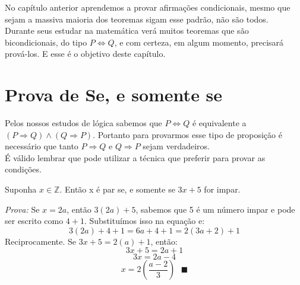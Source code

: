 \documentclass[main.tex]{subfiles}
\begin{document}
No capítulo anterior aprendemos a provar afirmações condicionais, mesmo que sejam a massiva maioria dos teoremas sigam esse padrão, não são todos.
\\
Durante seus estudar na matemática verá muitos teoremas que são bicondicionais, do tipo $P \Leftrightarrow Q$, e com certeza, em algum momento, precisará prová-los. E esse é o objetivo deste capítulo.

\section{Prova de Se, e somente se}
Pelos nossos estudos de lógica sabemos que $P \Leftrightarrow Q$ é equivalente a $(P \Rightarrow Q) \land (Q \Rightarrow P)$. Portanto para provarmos esse tipo de proposição é necessário que tanto $P \Rightarrow Q$ e $Q \Rightarrow P$ sejam verdadeiros.
\\
É válido lembrar que pode utilizar a técnica que preferir para provar as condições.

\begin{proposition}
Suponha $x \in \mathbb{Z}$. Então x é par se, e somente se $3x + 5$ for impar.
\end{proposition}
\textit{Prova:} Se $x = 2a$, então $3(2a) + 5$, sabemos que 5 é um número impar e pode ser escrito como $4+1$. Substituímos isso na equação e:
$$ 3(2a) + 4+1 = 6a+4+1 = 2(3a +2) +1$$
Reciprocamente. Se $3x + 5 = 2(a)+1$, então:
$$3x+5 = 2a+1$$
$$3x = 2a -4$$
$$x = 2 \left(\frac{a-2}{3} \right) \ \ \ \blacksquare $$
\end{document}
